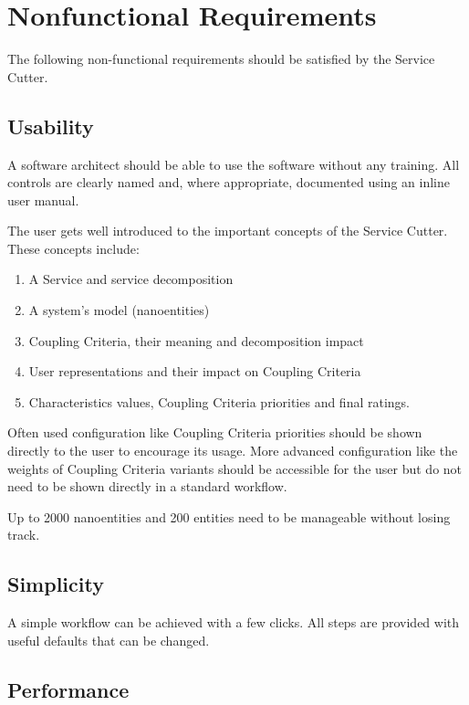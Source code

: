 \section{Nonfunctional Requirements}

The following non-functional requirements should be satisfied by the Service Cutter.

\subsection{Usability}
\label{sec:usability}

A software architect should be able to use the software without any training. All controls are clearly named and, where appropriate, documented using an inline user manual.

The user gets well introduced to the important concepts of the Service Cutter. These concepts include:

\begin{enumerate}
	\item A Service and service decomposition
	\item A system's model (nanoentities)
	\item Coupling Criteria, their meaning and decomposition impact
	\item User representations and their impact on Coupling Criteria
	\item Characteristics values, Coupling Criteria priorities and final ratings.
\end{enumerate}

Often used configuration like Coupling Criteria priorities should be shown directly to the user to encourage its usage. More advanced configuration like the weights of Coupling Criteria variants should be accessible for the user but do not need to be shown directly in a standard workflow. 

Up to 2000 nanoentities and 200 entities need to be manageable without losing track.

\subsection{Simplicity}

A simple workflow can be achieved with a few clicks. All steps are provided with useful defaults that can be changed.

\subsection{Performance}

